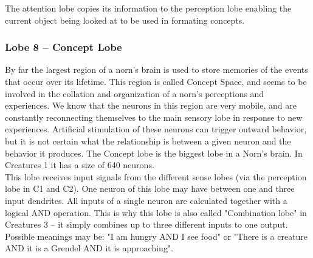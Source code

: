 \documentclass[11pt,twoside,a4paper]{article}
\begin{document}


The attention lobe copies its information to the perception lobe enabling the current object being looked at to be used in formating concepts.~\\

\subsubsection{Lobe 8 -- Concept Lobe}


By far the largest region of a norn's brain is used to store memories of the events that occur over its lifetime. This region is called Concept Space, and seems to be involved in the collation and organization of a norn's perceptions and experiences. We know that the neurons in this region are very mobile, and are constantly reconnecting themselves to the main sensory lobe in response to new experiences. Artificial stimulation of these neurons can trigger outward behavior, but it is not certain what the relationship is between a given neuron and the behavior it produces. The Concept lobe is the biggest lobe in a Norn's brain. In Creatures 1 it has a size of 640 neurons.~\\

This lobe receives input signals from the different sense lobes (via the perception lobe in C1 and C2). One neuron of this lobe may have between one and three input dendrites. All inputs of a single neuron are calculated together with a logical AND operation. This is why this lobe is also called "Combination lobe" in Creatures 3 -- it simply combines up to three different inputs to one output. Possible meanings may be: "I am hungry AND I see food" or "There is a creature AND it is a Grendel AND it is approaching".~\\
\end{document}
